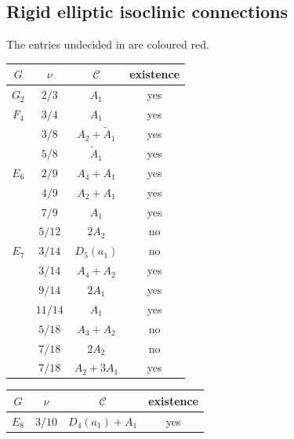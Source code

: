 \documentclass[11pt]{amsart}
\theoremstyle{definition}
\newcommand{\cC}{\mathcal{C}}
\begin{document}
\newpage 



\subsection{Rigid elliptic isoclinic connections} \label{ss:rigidTable}
The entries undecided in \cite{JY} are coloured red.
\begin{table}[H]
\begin{center}
\begin{tabular}{|c|c|c|c|}
\hline
$G$ 	& $\nu$   	& $\cC$ & existence    		\\
\hline
$G_2$         		& $2/3$   	& $A_1$ 			& \color{red}yes                		\\
$F_4$         		& $3/4$   	& $A_1$ 			& \color{red}yes                		\\
${}$          		& $3/8$   	& $A_2+\tilde{A}_1$ 	& \color{red}yes		\\
${}$          		& $5/8$   	& $\tilde{A}_1$ 		& yes         	\\
$E_6$         		& $2/9$   	& $A_4+A_1$ 		& \color{red}yes            \\
${}$          		& $4/9$   	& $A_2+A_1$ 		& \color{red}yes           	\\
${}$          		& $7/9$   	& $A_1$ 			& \color{red}yes                	\\
${}$          		& $5/12$  	& $2A_2$ 			& no               	\\
$E_7$         		& $3/14$  	& $D_5(a_1)$ 		& \color{red}no           	\\
${}$          		& $3/14$  	& $A_4+A_2$ 		& \color{red}yes           	\\
${}$          		& $9/14$  	& $2A_1$ 			& \color{red}yes               \\
${}$          		& $11/14$ 	& $A_1$ 			& \color{red}yes               \\
${}$          		& $5/18$  	& $A_3+A_2$ 		& no           	\\
${}$          		& $7/18$  	& $2A_2$ 			& no            \\
${}$         		 & $7/18$  	& $A_2+3A_1$ 		& yes           	\\
\hline
\end{tabular}
\qquad
\begin{tabular}{|c|c|c|c|}
\hline
$G$ 	& $\nu$   	& $\cC$ & existence     		\\
\hline
$E_8$         		& $3/10$  	& $D_4(a_1)+A_1$ 	& \color{red}yes        	\\

\end{tabular}
\end{center}
\end{table}
\end{document}
